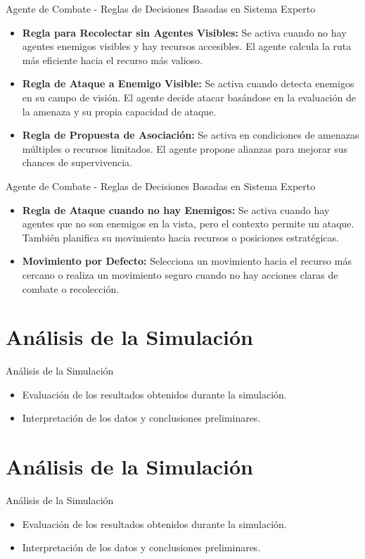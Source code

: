 \documentclass{beamer}
\begin{document}
\begin{frame}{Agente de Combate - Reglas de Decisiones Basadas en Sistema Experto}
  \begin{itemize}
    \item \textbf{Regla para Recolectar sin Agentes Visibles:} Se activa cuando no hay agentes enemigos visibles y hay recursos accesibles. El agente calcula la ruta más eficiente hacia el recurso más valioso.
    \item \textbf{Regla de Ataque a Enemigo Visible:} Se activa cuando detecta enemigos en su campo de visión. El agente decide atacar basándose en la evaluación de la amenaza y su propia capacidad de ataque.
    \item \textbf{Regla de Propuesta de Asociación:} Se activa en condiciones de amenazas múltiples o recursos limitados. El agente propone alianzas para mejorar sus chances de supervivencia.
  \end{itemize}
\end{frame}

\begin{frame}{Agente de Combate - Reglas de Decisiones Basadas en Sistema Experto}
  \begin{itemize}
    \item \textbf{Regla de Ataque cuando no hay Enemigos:} Se activa cuando hay agentes que no son enemigos en la vista, pero el contexto permite un ataque. También planifica su movimiento hacia recursos o posiciones estratégicas.
    \item \textbf{Movimiento por Defecto:} Selecciona un movimiento hacia el recurso más cercano o realiza un movimiento seguro cuando no hay acciones claras de combate o recolección.
  \end{itemize}
\end{frame}

\section{Análisis de la Simulación}
\begin{frame}{Análisis de la Simulación}
  \begin{itemize}
    \item Evaluación de los resultados obtenidos durante la simulación.
    \item Interpretación de los datos y conclusiones preliminares.
  \end{itemize}
\end{frame}

\section{Análisis de la Simulación}
\begin{frame}{Análisis de la Simulación}
  \begin{itemize}
    \item Evaluación de los resultados obtenidos durante la simulación.
    \item Interpretación de los datos y conclusiones preliminares.
  \end{itemize}
\end{frame}
\end{document}
